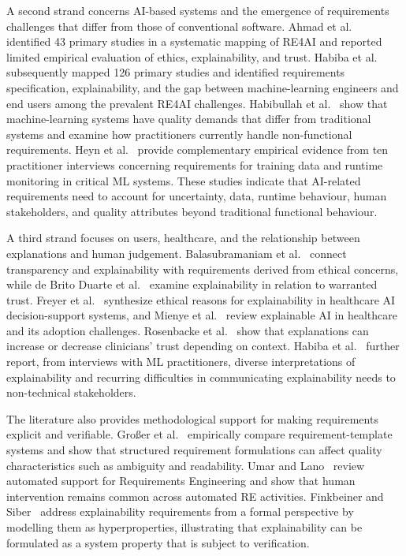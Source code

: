 \documentclass[pdflatex,sn-mathphys-num,Numbered]{sn-jnl}
\begin{document}
A second strand concerns AI-based systems and the emergence of requirements challenges that differ from those of conventional software. Ahmad et al.~\cite{ahmad2023} identified 43 primary studies in a systematic mapping of RE4AI and reported limited empirical evaluation of ethics, explainability, and trust. Habiba et al.~\cite{habiba2024} subsequently mapped 126 primary studies and identified requirements specification, explainability, and the gap between machine-learning engineers and end users among the prevalent RE4AI challenges. Habibullah et al.~\cite{habibullah2023} show that machine-learning systems have quality demands that differ from traditional systems and examine how practitioners currently handle non-functional requirements. Heyn et al.~\cite{heyn2024} provide complementary empirical evidence from ten practitioner interviews concerning requirements for training data and runtime monitoring in critical ML systems. These studies indicate that AI-related requirements need to account for uncertainty, data, runtime behaviour, human stakeholders, and quality attributes beyond traditional functional behaviour.

A third strand focuses on users, healthcare, and the relationship between explanations and human judgement. Balasubramaniam et al.~\cite{balasubramaniam2023} connect transparency and explainability with requirements derived from ethical concerns, while de Brito Duarte et al.~\cite{debritoduarte2023} examine explainability in relation to warranted trust. Freyer et al.~\cite{freyer2024} synthesize ethical reasons for explainability in healthcare AI decision-support systems, and Mienye et al.~\cite{mienye2024} review explainable AI in healthcare and its adoption challenges. Rosenbacke et al.~\cite{rosenbacke2024} show that explanations can increase or decrease clinicians' trust depending on context. Habiba et al.~\cite{habiba2025} further report, from interviews with ML practitioners, diverse interpretations of explainability and recurring difficulties in communicating explainability needs to non-technical stakeholders.

The literature also provides methodological support for making requirements explicit and verifiable. Großer et al.~\cite{grosser2024} empirically compare requirement-template systems and show that structured requirement formulations can affect quality characteristics such as ambiguity and readability. Umar and Lano~\cite{umar2024} review automated support for Requirements Engineering and show that human intervention remains common across automated RE activities. Finkbeiner and Siber~\cite{finkbeiner2025} address explainability requirements from a formal perspective by modelling them as hyperproperties, illustrating that explainability can be formulated as a system property that is subject to verification.
\end{document}
